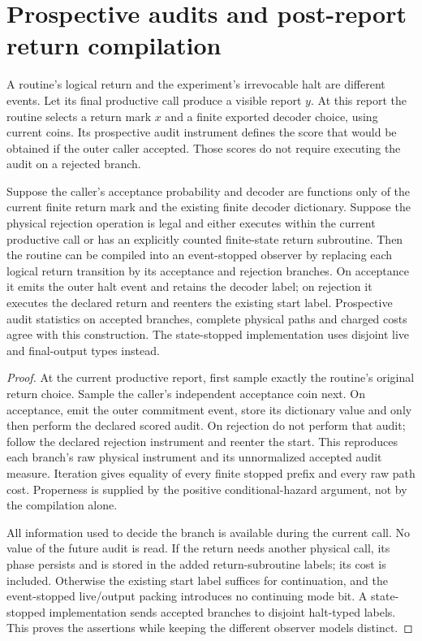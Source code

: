 \section{Prospective audits and post-report return compilation}
A routine's logical return and the experiment's irrevocable halt are different events. Let its final productive call produce a visible report $y$. At this report the routine selects a return mark $x$ and a finite exported decoder choice, using current coins. Its prospective audit instrument defines the score that would be obtained if the outer caller accepted. Those scores do not require executing the audit on a rejected branch.
\begin{proposition}\label{prop:compile}
Suppose the caller's acceptance probability and decoder are functions only of the current finite return mark and the existing finite decoder dictionary. Suppose the physical rejection operation is legal and either executes within the current productive call or has an explicitly counted finite-state return subroutine. Then the routine can be compiled into an event-stopped observer by replacing each logical return transition by its acceptance and rejection branches. On acceptance it emits the outer halt event and retains the decoder label; on rejection it executes the declared return and reenters the existing start label. Prospective audit statistics on accepted branches, complete physical paths and charged costs agree with this construction. The state-stopped implementation uses disjoint live and final-output types instead.
\end{proposition}
\begin{proof}
At the current productive report, first sample exactly the routine's original return choice. Sample the caller's independent acceptance coin next. On acceptance, emit the outer commitment event, store its dictionary value and only then perform the declared scored audit. On rejection do not perform that audit; follow the declared rejection instrument and reenter the start. This reproduces each branch's raw physical instrument and its unnormalized accepted audit measure. Iteration gives equality of every finite stopped prefix and every raw path cost. Properness is supplied by the positive conditional-hazard argument, not by the compilation alone.

All information used to decide the branch is available during the current call. No value of the future audit is read. If the return needs another physical call, its phase persists and is stored in the added return-subroutine labels; its cost is included. Otherwise the existing start label suffices for continuation, and the event-stopped live/output packing introduces no continuing mode bit. A state-stopped implementation sends accepted branches to disjoint halt-typed labels. This proves the assertions while keeping the different observer models distinct.
\end{proof}

